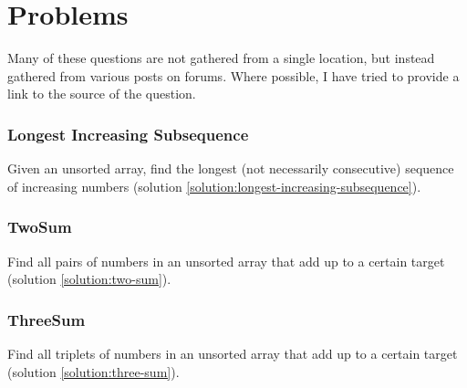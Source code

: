 \chapter{Problems} \label{chap:problems}

Many of these questions are not gathered from a single location, but instead gathered from various posts on forums.  Where possible, I have tried to provide a link to the source of the question.

\subsection{Longest Increasing Subsequence} \label{question:longest-increasing-subsequence}

Given an unsorted array, find the longest (not necessarily consecutive) sequence of increasing numbers (solution \ref{solution:longest-increasing-subsequence}).

\subsection{TwoSum} \label{question:two-sum}

Find all pairs of numbers in an unsorted array that add up to a certain target (solution \ref{solution:two-sum}).

\subsection{ThreeSum} \label{question:two-sum}

Find all triplets of numbers in an unsorted array that add up to a certain target (solution \ref{solution:three-sum}).
